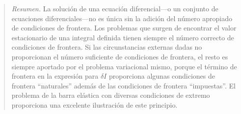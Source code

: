\documentclass[12pt,a4paper]{book}
\begin{document}
\begin{quote}
\textit{Resumen.} La solución de una ecuación diferencial---o un conjunto de ecuaciones diferenciales---no es única sin la adición del número apropiado de condiciones de frontera. Los problemas que surgen de encontrar el valor estacionario de una integral definida tienen siempre el número correcto de condiciones de frontera. Si las circunstancias externas dadas no proporcionan el número suficiente de condiciones de frontera, el resto es siempre aportado por el problema variacional mismo, porque el término de frontera en la expresión para $\delta I$ proporciona algunas condiciones de frontera ``naturales'' además de las condiciones de frontera ``impuestas''. El problema de la barra elástica con diversas condiciones de extremo proporciona una excelente ilustración de este principio.
\end{quote}
\end{document}
